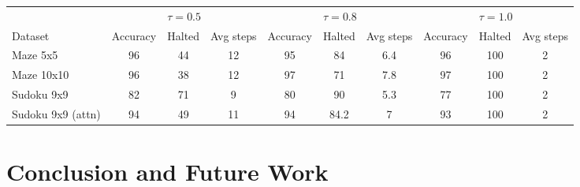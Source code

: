 \documentclass{article}
\begin{document}
\begin{strip}
\begin{center}
\footnotesize
\setlength{\tabcolsep}{5pt}
    \label{tab:ea-results}
    \begin{tabular}{l ccc ccc ccc}
    \toprule
    & \multicolumn{3}{c}{$\tau = 0.5$}
    & \multicolumn{3}{c}{$\tau = 0.8$}
    & \multicolumn{3}{c}{$\tau = 1.0$} \\
    \cmidrule(lr){2-4} \cmidrule(lr){5-7} \cmidrule(lr){8-10}
    Dataset
    & Accuracy & Halted & Avg steps
    & Accuracy & Halted & Avg steps
    & Accuracy & Halted & Avg steps \\
    \midrule
    Maze 5x5          & 96 & 44 & 12 & 95 & 84 & 6.4 & 96 & 100 & 2 \\
    Maze 10x10        & 96 & 38 & 12 & 97 & 71 & 7.8 & 97 & 100 & 2 \\
    Sudoku 9x9        & 82 & 71 & 9 & 80 & 90 & 5.3 & 77 & 100 & 2 \\
    Sudoku 9x9 (attn) & 94 & 49 & 11 & 94 & 84.2 & 7 & 93 & 100 & 2 \\
    \bottomrule
    \end{tabular}
\end{center}
\end{strip}


\section{Conclusion and Future Work}
\end{document}
